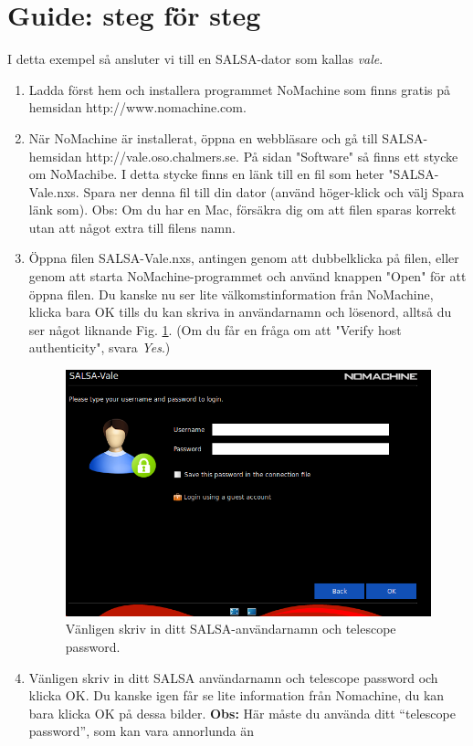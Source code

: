 \section{Guide: steg för steg}
I detta exempel så ansluter vi till en SALSA-dator som kallas \emph{vale}.
\begin{enumerate}
	\item Ladda först hem och installera programmet NoMachine som finns gratis
		på hemsidan http://www.nomachine.com. 
\item När NoMachine är installerat, öppna en webbläsare och gå till SALSA-hemsidan 
	http://vale.oso.chalmers.se. På sidan "Software" så finns ett stycke om 
	NoMachibe. I detta stycke finns en länk till en fil som heter "SALSA-Vale.nxs.
	Spara ner denna fil till din dator (använd höger-klick och välj Spara länk som).
	Obs: Om du har en Mac, försäkra dig om att filen sparas korrekt utan att något
	extra till filens namn.
\item Öppna filen SALSA-Vale.nxs, antingen genom att dubbelklicka på filen, eller genom
	att starta NoMachine-programmet och använd knappen "Open" för att öppna filen. 
	Du kanske nu ser lite välkomstinformation från NoMachine, klicka bara OK tills du
	kan skriva in användarnamn och lösenord, alltså du ser något liknande Fig. 
	\ref{fig:login}. (Om du får en fråga om att "Verify host authenticity", svara 
	\emph{Yes}.)
\begin{figure}[H]
    \centering
    \includegraphics[height=0.5\textwidth]{../figures/nomachinefigs/SALSA_login.png}
    \caption{Vänligen skriv in ditt SALSA-användarnamn och telescope password.}
    \label{fig:login}
\end{figure}
\item Vänligen skriv in ditt SALSA användarnamn och telescope password och klicka OK. 
	Du kanske igen får se lite information från Nomachine, du kan bara klicka OK
	på dessa bilder. 
{\bf Obs:} Här måste du använda ditt ``telescope password'', som kan vara annorlunda än 

\end{enumerate}
